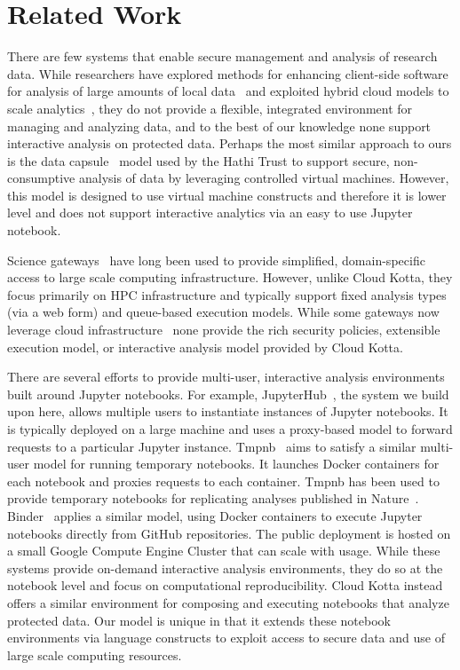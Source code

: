 \section{Related Work}

There are few systems that enable secure management and 
analysis of research data. While researchers have explored 
methods for enhancing client-side software for analysis of 
large amounts of local data~\cite{saleem14bigexcel} and 
exploited hybrid cloud models to scale analytics~\cite{abramson14hybrid},
they do not provide a flexible, integrated environment
for managing and analyzing data, and to the best of our knowledge
none support interactive analysis on protected data. Perhaps the most similar 
approach to ours is the data capsule~\cite{zheng14capsules} model used by
the Hathi Trust to support secure, non-consumptive analysis of data by leveraging 
controlled virtual machines. However, this model is designed to use virtual
machine constructs and therefore it is lower level and does not support interactive analytics via
an easy to use Jupyter notebook.

Science gateways~\cite{wikinsdiehr07gateways} have long been used to 
provide simplified, domain-specific access to large scale computing
infrastructure. However, unlike Cloud Kotta, they focus primarily
on HPC infrastructure and typically support fixed analysis types
(via a web form) and queue-based execution models. While some
gateways now leverage cloud infrastructure~\cite{madduri2014globus}
none provide the rich security policies, extensible execution model, 
or interactive analysis model provided by Cloud Kotta. 

There are several efforts to provide multi-user, interactive
analysis environments built around Jupyter notebooks.
For example, JupyterHub~\cite{jupyterhub}, the system 
we build upon here, allows multiple users to
instantiate instances of Jupyter notebooks. It is typically
deployed on a large machine and uses a proxy-based model
to forward requests to a particular Jupyter instance. 
Tmpnb~\cite{tmpnb} aims to satisfy a similar multi-user
model for running temporary notebooks. It launches Docker
containers for each notebook and proxies requests
to each container. Tmpnb has been used to provide
temporary notebooks for replicating analyses published 
in Nature~\cite{shen14notebooks}. 
Binder~\cite{binder} applies a similar model, using
Docker containers to execute Jupyter notebooks directly
from GitHub repositories.  The public deployment
is hosted on a small Google Compute Engine Cluster that can
scale with usage. 
While these systems provide on-demand interactive analysis environments,
they do so at the notebook level and focus on computational reproducibility. 
Cloud Kotta instead offers a similar environment for composing and executing notebooks
that analyze protected data. Our model is unique in that it extends these 
notebook environments via language constructs to exploit access
to secure data and use of large scale computing resources. 

